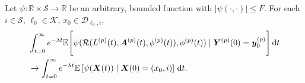 \begin{cor}\label{cor: lk}
	Let \(\psi: \mathbb R\times \mathcal S \to \mathbb R\) be an arbitrary, bounded function with \(|\psi(\cdot,\cdot)|\leq F\). %
	For each \(i\in\mathcal S\), \(\ell_0\in\mathcal K\), \(x_0\in\mathcal D_{\ell_0,i}\),
	\begin{align}
		&\int_{t=0}^\infty e^{-\lambda t}\mathbb E\Bigg[\psi(\mathcal R(L^{(p)}(t),\boldsymbol A^{(p)}(t),\phi^{(p)}(t)),\phi^{(p)}(t) )  \mid \nonumber
		\boldsymbol Y^{(p)}(0)=\boldsymbol y_0^{(p)} \Bigg] \, \mathrm{d} t \nonumber
		\\&\to \int_{t=0}^\infty e^{-\lambda t}  \mathbb E\left[\psi({\boldsymbol X}(t))\mid \boldsymbol X(0)=(x_0, i) \right] \, \mathrm{d} t.\nonumber
	\end{align}
\end{cor}

